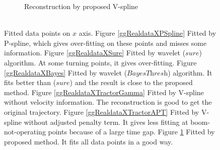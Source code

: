 \begin{figure}
\begin{subfigure}{0.45\textwidth}
    \caption{Reconstruction by proposed V-spline \\ \mbox{  }}\label{ggRealdataXTractor}
    \end{subfigure}
 \caption{Fitted data points on $x$ axis. Figure \ref{ggRealdataXPSpline} Fitted by P-spline, which gives over-fitting on these points and misses some information. Figure \ref{ggRealdataXSure} Fitted by wavelet ($\textit{sure}$) algorithm. At some turning points, it gives over-fitting. Figure \ref{ggRealdataXBayes} Fitted by wavelet ($\textit{BayesThresh}$) algorithm. It fits better than ($\textit{sure}$) and the result is close to the proposed method. Figure \ref{ggRealdataXTractorGamma} Fitted by V-spline without velocity information. The reconstruction is good to get the original trajectory. Figure \ref{ggRealdataXTractorAPT} Fitted by V-spline without adjusted penalty term. It gives less fitting at boom-not-operating points because of a large time gap. Figure \ref{ggRealdataXTractor} Fitted by proposed method. It fits all data points in a good way.}\label{1dx}
 \end{figure}


